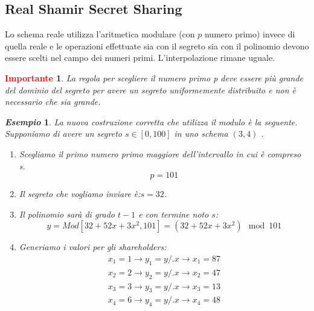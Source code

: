 \documentclass{book}
\newtheorem*{Importante}{\textbf{\textcolor{red}{Importante}}}
\newtheorem{esempio}{\emph{Esempio}}
\begin{document}
\subsection{Real Shamir Secret Sharing}
Lo schema reale utilizza l'aritmetica modulare (con \(p\) numero primo) invece di quella reale e  le operazioni effettuate sia con il segreto sia con il polinomio devono essere scelti nel campo dei numeri primi\@.\newline
L'interpolazione rimane uguale\@.
\begin{Importante}
    La regola per scegliere il numero primo p deve essere più grande del dominio del segreto per avere un segreto uniformemente distribuito e non è necessario che sia grande\@.
\end{Importante}
\begin{esempio}
    La nuova costruzione corretta che utilizza il modulo è la seguente\@.\newline
    Supponiamo di avere un segreto \(s\in[0,100]\) in uno schema \((3,4) \) \@.
    \begin{enumerate}
        \item Scegliamo il primo numero primo maggiore dell'intervallo in cui è compreso s\@.
              \begin{equation*}
                  p=101
              \end{equation*}
        \item Il segreto che vogliamo inviare è:\@ \(s=32\).
        \item Il polinomio sarà di grado \(t-1\) e con termine noto \(s\):\begin{equation*}
                  y=Mod[32+52x+3x^{2},101]=(32+52x+3x^{2})\mod{101}
              \end{equation*}
        \item Generiamo i valori per gli shareholders:
              \begin{equation*}
                  \begin{matrix}
                      x_{1}=1\rightarrow y_{1}=y/.{x\rightarrow x_{1}}=87 \\
                      x_{2}=2\rightarrow y_{2}=y/.{x\rightarrow x_{2}}=47 \\
                      x_{3}=3\rightarrow y_{3}=y/.{x\rightarrow x_{3}}=13 \\
                      x_{4}=6\rightarrow y_{4}=y/.{x\rightarrow x_{4}}=48 \\
                  \end{matrix}
              \end{equation*}

\end{enumerate}
\end{esempio}
\end{document}

